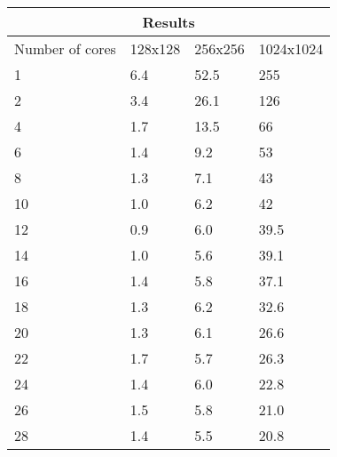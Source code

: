 \documentclass{article}
\begin{document}
\begin{multicols}{2}
\begin{center}
  \begin{tabular}{ |p{1.5cm}||p{1.5cm}|p{1.5cm}|p{1.5cm}| }
 \hline
 \multicolumn{4}{|c|}{Results} \\
 \hline
 Number of cores & 128x128 & 256x256 & 1024x1024 \\
 \hline
 1  & 6.4 &  52.5  &  255     \\
 2  & 3.4 &  26.1  &  126     \\
 4  & 1.7 &  13.5  &  66      \\ 
 6  & 1.4 &  9.2   &  53      \\ 
 8  & 1.3 &  7.1   &  43      \\ 
 10 & 1.0 &  6.2   &  42      \\
 12 & 0.9 &  6.0   &  39.5    \\
 14 & 1.0 &  5.6   &  39.1    \\ 
 16 & 1.4 &  5.8   &  37.1    \\ 
 18 & 1.3 &  6.2   &  32.6    \\
 20 & 1.3 &  6.1   &  26.6    \\
 22 & 1.7 &  5.7   &  26.3    \\ 
 24 & 1.4 &  6.0   &  22.8    \\ 
 26 & 1.5 &  5.8   &  21.0    \\ 
 28 & 1.4 &  5.5   &  20.8    \\
 \hline
\end{tabular}
\label{tab:parallelresults}
\end{center}

\end{multicols}
\end{document}
